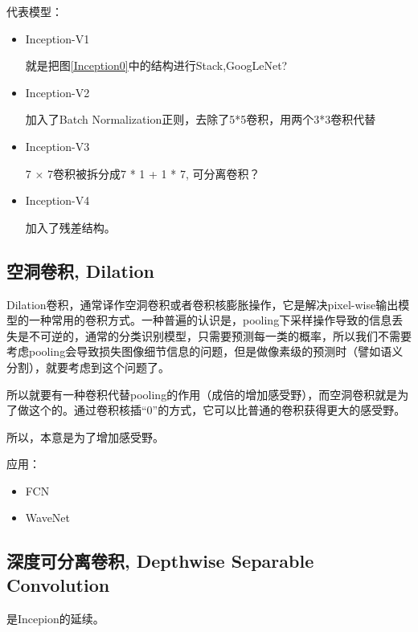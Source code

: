 代表模型：
\begin{itemize}
\item Inception-V1

就是把图\ref{Inception0}中的结构进行Stack,GoogLeNet?

\item Inception-V2

加入了Batch Normalization正则，去除了5*5卷积，用两个3*3卷积代替

\item Inception-V3

7 × 7卷积被拆分成7 * 1 + 1 * 7, 可分离卷积？

\item Inception-V4

加入了残差结构。

\end{itemize}

\subsection{空洞卷积, Dilation}

Dilation卷积，通常译作空洞卷积或者卷积核膨胀操作，它是解决pixel-wise输出模型的一种常用的卷积方式。一种普遍的认识是，pooling下采样操作导致的信息丢失是不可逆的，通常的分类识别模型，只需要预测每一类的概率，所以我们不需要考虑pooling会导致损失图像细节信息的问题，但是做像素级的预测时（譬如语义分割），就要考虑到这个问题了。

所以就要有一种卷积代替pooling的作用（成倍的增加感受野），而空洞卷积就是为了做这个的。通过卷积核插“0”的方式，它可以比普通的卷积获得更大的感受野。

所以，本意是为了增加感受野。

应用：
\begin{itemize}
\item FCN
\item WaveNet
\end{itemize}

\subsection{深度可分离卷积, Depthwise Separable Convolution}

是Incepion的延续。

